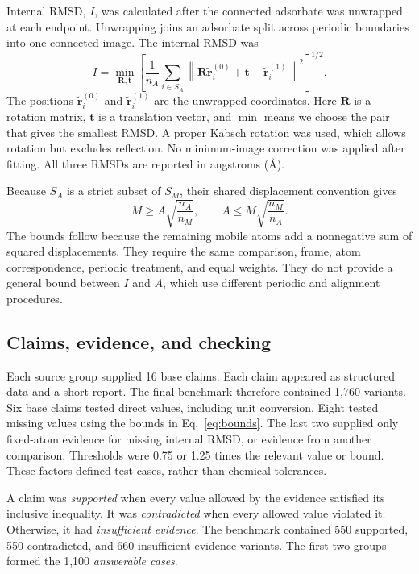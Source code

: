 Internal RMSD, $I$, was calculated after the connected adsorbate was unwrapped at each endpoint. Unwrapping joins an adsorbate split across periodic boundaries into one connected image. The internal RMSD was
\begin{equation}
 I=\min_{\mathbf R,\mathbf t}
 \left[\frac{1}{n_A}\sum_{i\in S_A}
 \left\|\mathbf R\widetilde{\mathbf r}_i^{(0)}+\mathbf t
       -\widetilde{\mathbf r}_i^{(1)}\right\|^2\right]^{1/2}.
 \label{eq:internal}
\end{equation}
The positions $\widetilde{\mathbf r}_i^{(0)}$ and $\widetilde{\mathbf r}_i^{(1)}$ are the unwrapped coordinates. Here $\mathbf R$ is a rotation matrix, $\mathbf t$ is a translation vector, and $\min$ means we choose the pair that gives the smallest RMSD. A proper Kabsch rotation was used, which allows rotation but excludes reflection.\cite{kabsch1978discussion} No minimum-image correction was applied after fitting. All three RMSDs are reported in angstroms (\AA).

Because $S_A$ is a strict subset of $S_M$, their shared displacement convention gives
\begin{equation}
 M\geq A\sqrt{\frac{n_A}{n_M}},
 \qquad
 A\leq M\sqrt{\frac{n_M}{n_A}}.
 \label{eq:bounds}
\end{equation}
The bounds follow because the remaining mobile atoms add a nonnegative sum of squared displacements. They require the same comparison, frame, atom correspondence, periodic treatment, and equal weights. They do not provide a general bound between $I$ and $A$, which use different periodic and alignment procedures.

\subsection{Claims, evidence, and checking}

Each source group supplied 16 base claims. Each claim appeared as structured data and a short report. The final benchmark therefore contained 1,760 variants. Six base claims tested direct values, including unit conversion. Eight tested missing values using the bounds in Eq.~\ref{eq:bounds}. The last two supplied only fixed-atom evidence for missing internal RMSD, or evidence from another comparison. Thresholds were 0.75 or 1.25 times the relevant value or bound. These factors defined test cases, rather than chemical tolerances.

A claim was \emph{supported} when every value allowed by the evidence satisfied its inclusive inequality. It was \emph{contradicted} when every allowed value violated it. Otherwise, it had \emph{insufficient evidence}. The benchmark contained 550 supported, 550 contradicted, and 660 insufficient-evidence variants. The first two groups formed the 1,100 \emph{answerable cases}.

